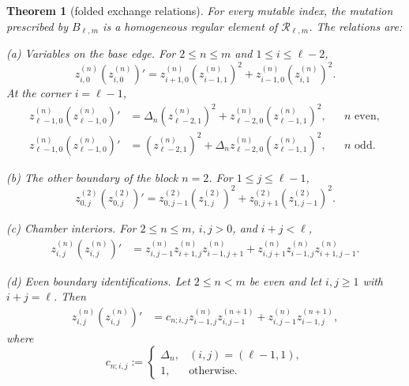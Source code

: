 \documentclass[11pt]{amsart}
\newtheorem{theorem}{Theorem}[section]
\theoremstyle{definition}
\theoremstyle{remark}
\newcommand{\cR}{\mathcal R}
\begin{document}
\begin{theorem}[folded exchange relations]
\label{thm:folded-relations}
For every mutable index, the mutation prescribed by $B_{\ell,m}$ is a
homogeneous regular element of $\cR_{\ell,m}$.  The relations are:

\smallskip
\noindent\emph{(a) Variables on the base edge.}  For $2\le n\le m$ and
$1\le i\le\ell-2$,
\begin{equation}
 z_{i,0}^{(n)}(z_{i,0}^{(n)})'
 =z_{i+1,0}^{(n)}(z_{i-1,1}^{(n)})^2
  +z_{i-1,0}^{(n)}(z_{i,1}^{(n)})^2.
 \label{eq:base-edge}
\end{equation}
At the corner $i=\ell-1$,
\begin{align}
 z_{\ell-1,0}^{(n)}(z_{\ell-1,0}^{(n)})'
 &=\Delta_n(z_{\ell-2,1}^{(n)})^2
   +z_{\ell-2,0}^{(n)}(z_{\ell-1,1}^{(n)})^2,
 &&n\text{ even},
 \label{eq:base-edge-even-corner}\\
 z_{\ell-1,0}^{(n)}(z_{\ell-1,0}^{(n)})'
 &=(z_{\ell-2,1}^{(n)})^2
   +\Delta_nz_{\ell-2,0}^{(n)}(z_{\ell-1,1}^{(n)})^2,
 &&n\text{ odd}.
 \label{eq:base-edge-odd-corner}
\end{align}

\smallskip
\noindent\emph{(b) The other boundary of the block $n=2$.}  For
$1\le j\le\ell-1$,
\begin{equation}
 z_{0,j}^{(2)}(z_{0,j}^{(2)})'
 =z_{0,j-1}^{(2)}(z_{1,j}^{(2)})^2
  +z_{0,j+1}^{(2)}(z_{1,j-1}^{(2)})^2.
 \label{eq:first-boundary}
\end{equation}

\smallskip
\noindent\emph{(c) Chamber interiors.}  For $2\le n\le m$, $i,j>0$, and
$i+j<\ell$,
\begin{align}
 z_{i,j}^{(n)}(z_{i,j}^{(n)})'
 & =z_{i,j-1}^{(n)}z_{i+1,j}^{(n)}z_{i-1,j+1}^{(n)}
+z_{i,j+1}^{(n)}z_{i-1,j}^{(n)}z_{i+1,j-1}^{(n)}.
 \label{eq:interior}
\end{align}

\smallskip
\noindent\emph{(d) Even boundary identifications.}  Let $2\le n<m$ be even and let
$i,j\ge1$ with $i+j=\ell$.  Then
\begin{align}
 z_{i,j}^{(n)}(z_{i,j}^{(n)})'
 &=c_{n;i,j}
   z_{i-1,j}^{(n)}z_{i,j-1}^{(n+1)}
+z_{i,j-1}^{(n)}z_{i-1,j}^{(n+1)},
 \label{eq:even-gluing}
\end{align}
where
\begin{equation}
 c_{n;i,j}:=
 \begin{cases}
  \Delta_n,&(i,j)=(\ell-1,1),\\
  1,&\text{otherwise}.
 \end{cases}
 \label{eq:even-corner-factor}
\end{equation}


\end{theorem}
\end{document}

